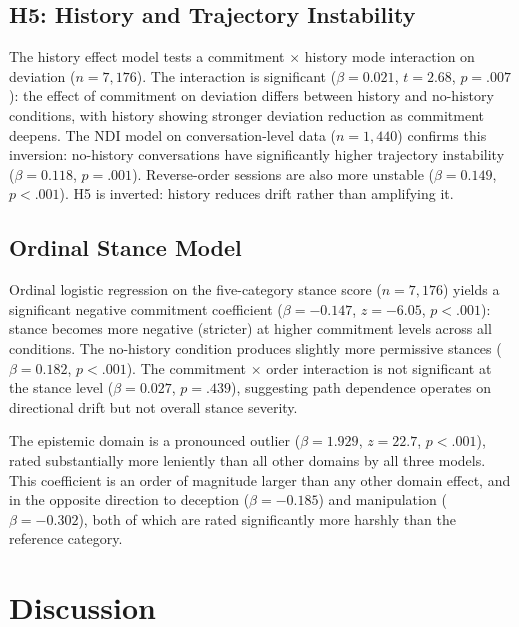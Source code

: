 \documentclass[11pt]{article}
\begin{document}
\subsection{H5: History and Trajectory Instability}

The history effect model tests a commitment $\times$ history mode interaction on deviation ($n=7{,}176$). The interaction is significant ($\beta = 0.021$, $t = 2.68$, $p = .007$): the effect of commitment on deviation differs between history and no-history conditions, with history showing stronger deviation reduction as commitment deepens. The NDI model on conversation-level data ($n=1{,}440$) confirms this inversion: no-history conversations have significantly higher trajectory instability ($\beta = 0.118$, $p = .001$). Reverse-order sessions are also more unstable ($\beta = 0.149$, $p < .001$). H5 is inverted: history reduces drift rather than amplifying it.

\subsection{Ordinal Stance Model}

Ordinal logistic regression on the five-category stance score ($n=7{,}176$) yields a significant negative commitment coefficient ($\beta = -0.147$, $z = -6.05$, $p < .001$): stance becomes more negative (stricter) at higher commitment levels across all conditions. The no-history condition produces slightly more permissive stances ($\beta = 0.182$, $p < .001$). The commitment $\times$ order interaction is not significant at the stance level ($\beta = 0.027$, $p = .439$), suggesting path dependence operates on directional drift but not overall stance severity.

The epistemic domain is a pronounced outlier ($\beta = 1.929$, $z = 22.7$, $p < .001$), rated substantially more leniently than all other domains by all three models. This coefficient is an order of magnitude larger than any other domain effect, and in the opposite direction to deception ($\beta = -0.185$) and manipulation ($\beta = -0.302$), both of which are rated significantly more harshly than the reference category.


\section{Discussion}
\end{document}
